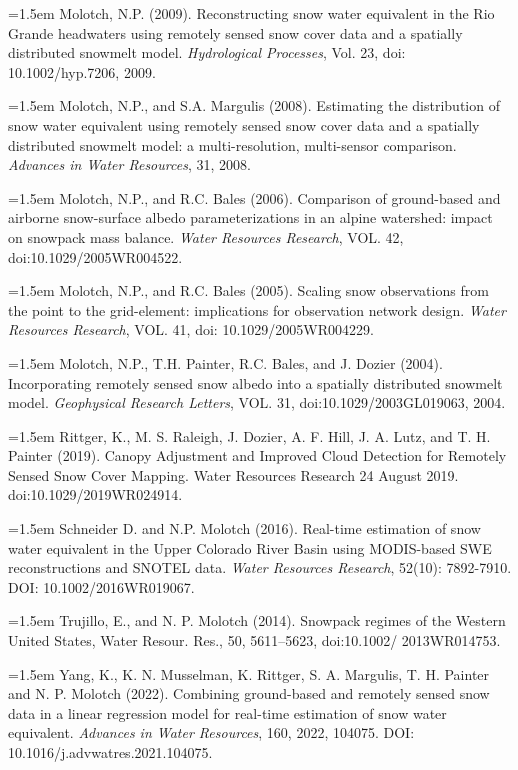 \documentclass{article}
\begin{document}
\noindent
\hangindent=1.5em
Molotch, N.P. (2009). Reconstructing snow water equivalent in the Rio Grande headwaters using remotely sensed snow cover data and a spatially distributed snowmelt model. \textit{Hydrological Processes}, Vol. 23, doi: 10.1002/hyp.7206, 2009.

\noindent
\hangindent=1.5em
Molotch, N.P., and S.A. Margulis (2008). Estimating the distribution of snow water equivalent using remotely sensed snow cover data and a spatially distributed snowmelt model: a multi-resolution, multi-sensor comparison. \textit{Advances in Water Resources}, 31, 2008.

\noindent
\hangindent=1.5em
Molotch, N.P., and R.C. Bales (2006). Comparison of ground-based and airborne snow-surface albedo parameterizations in an alpine watershed: impact on snowpack mass balance. \textit{Water Resources Research}, VOL. 42, doi:10.1029/2005WR004522.

\noindent
\hangindent=1.5em
Molotch, N.P., and R.C. Bales (2005). Scaling snow observations from the point to the grid-element: implications for observation network design. \textit{Water Resources Research}, VOL. 41, doi: 10.1029/2005WR004229.

\noindent
\hangindent=1.5em
Molotch, N.P., T.H. Painter, R.C. Bales, and J. Dozier (2004). Incorporating remotely sensed snow albedo into a spatially distributed snowmelt model. \textit{Geophysical Research Letters}, VOL. 31, doi:10.1029/2003GL019063, 2004.

\noindent
\hangindent=1.5em
Rittger, K., M. S. Raleigh, J. Dozier, A. F. Hill, J. A. Lutz, and T. H. Painter (2019). Canopy Adjustment and Improved Cloud Detection for Remotely Sensed Snow Cover Mapping. Water Resources Research 24 August 2019. doi:10.1029/2019WR024914.

\noindent
\hangindent=1.5em
Schneider D. and N.P. Molotch (2016). Real-time estimation of snow water equivalent in the Upper Colorado River Basin using MODIS-based SWE reconstructions and SNOTEL data. \textit{Water Resources Research}, 52(10): 7892-7910. DOI: 10.1002/2016WR019067.

\noindent
\hangindent=1.5em
Trujillo, E., and N. P. Molotch (2014). Snowpack regimes of the Western United States, Water Resour. Res., 50, 5611–5623, doi:10.1002/ 2013WR014753.

\noindent
\hangindent=1.5em
Yang, K., K. N. Musselman, K. Rittger, S. A. Margulis, T. H. Painter and N. P. Molotch (2022). Combining ground-based and remotely sensed snow data in a linear regression model for real-time estimation of snow water equivalent. \textit{Advances in Water Resources}, 160, 2022, 104075. DOI: 10.1016/j.advwatres.2021.104075.
\end{document}
